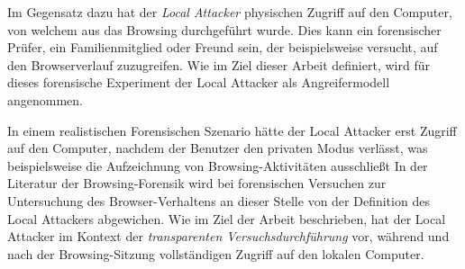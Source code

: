 Im Gegensatz dazu hat der \textit{Local Attacker} physischen Zugriff auf den Computer, von welchem aus das Browsing durchgeführt wurde. Dies kann ein forensischer Prüfer, ein Familienmitglied oder Freund sein, der  beispielsweise versucht, auf den Browserverlauf zuzugreifen. 
Wie im Ziel dieser Arbeit definiert, wird für dieses forensische Experiment der Local Attacker als Angreifermodell angenommen. \cite{Aggarwal.2010}

In einem realistischen Forensischen Szenario hätte der Local Attacker erst Zugriff auf den Computer, nachdem der Benutzer den privaten Modus verlässt, was beispielsweise die Aufzeichnung von Browsing-Aktivitäten ausschließt \cite{Aggarwal.2010}
In der Literatur der Browsing-Forensik wird bei forensischen Versuchen zur Untersuchung des Browser-Verhaltens an dieser Stelle von der Definition des Local Attackers abgewichen. 
Wie im Ziel der Arbeit beschrieben, hat der Local Attacker im Kontext der \textit{transparenten Versuchsdurchführung} vor, während und nach der Browsing-Sitzung vollständigen Zugriff auf den lokalen Computer. \cite{Fayyad.2021, Rochmadi.2017}




